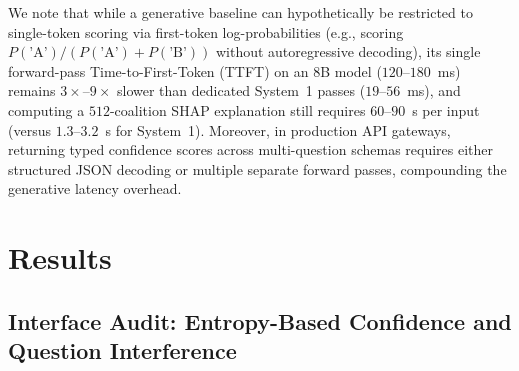 \documentclass[10pt]{article}
\begin{document}
We note that while a generative baseline can hypothetically be restricted to single-token scoring via first-token log-probabilities (e.g., scoring $P(\text{'A'}) / (P(\text{'A'}) + P(\text{'B'}))$ without autoregressive decoding), its single forward-pass Time-to-First-Token (TTFT) on an 8B model ($120$--$180$~ms) remains $3\times$--$9\times$ slower than dedicated System~1 passes ($19$--$56$~ms), and computing a $512$-coalition SHAP explanation still requires $60$--$90$~s per input (versus $1.3$--$3.2$~s for System~1).
Moreover, in production API gateways, returning typed confidence scores across multi-question schemas requires either structured JSON decoding or multiple separate forward passes, compounding the generative latency overhead.

\begin{table}[t]
\centering
\caption{Uncached sequential latency (median / p90 in ms), mean output tokens, and throughput (req/s) of single-question requests across evaluated System~1 decision models and generative System~2 baselines (\texttt{Gemma4-8B} direct JSON and Chain-of-Thought). Best values are in \textbf{bold}.}
\label{tab:latency}
\resizebox{\textwidth}{!}{}
\end{table}

\section{Results}
\label{sec:results}

\subsection{Interface Audit: Entropy-Based Confidence and Question Interference}
\label{sec:interference}
\end{document}
